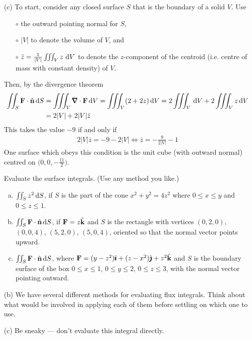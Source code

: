 \begin{solution}
\noindent (c)
To start, consider any closed surface $S$ that is the boundary of a
solid $V$. Use 
\begin{itemize}\itemsep1pt \parskip0pt  %
\item[$\circ$]
the outward pointing normal for $S$, 
\item[$\circ$]
$|V|$ to denote the volume of $V$, and
\item[$\circ$] 
$\bar z=\frac{1}{|V|}\tripInt_V z\ \dee{V}$ to denote the $z$-component 
of the centroid (i.e. centre of mass with constant density) of $V$.
\end{itemize}
Then, by the divergence theorem
\begin{align*}
\dblInt_{S} \vF\cdot\hn\,\dee{S}
&=\tripInt_V \vnabla\cdot\vF\,\dee{V}
=\tripInt_V (2+2z)\,\dee{V}
=2\tripInt_V \,\dee{V} +2\tripInt_V z\,\dee{V} \\
&=2|V| +2|V|\bar z
\end{align*}
This takes the value $-9$ if and only if
\begin{align*}
 2|V|\bar z =-9-2|V| \iff
\bar z = -\frac{9}{2|V|}-1
\end{align*}
One surface which obeys this condition is the unit cube (with outward normal)
centred on $\big(0,0, -\frac{11}{2}\big)$.


\end{solution}

\begin{question}[M317 2011D] %
Evaluate the surface integrals. (Use any method you like.)
\begin{enumerate}[(a)]
\item
$\iint_S z^2\,\mathrm{d}S$, if $S$ is the part of the cone 
$x^2 + y^2 = 4z^2$ where $0 \le x \le y$ and $0 \le z \le 1$.

\item
$\iint_S \mathbf{F} \cdot \hat{\mathbf{n}}\,\mathrm{d}S$, if $\mathbf{F} = z\hat{\mathbf{k}}$ and $S$ is the rectangle 
with vertices $(0, 2, 0)$, $(0, 0, 4)$, $(5, 2, 0)$, $(5, 0, 4)$, oriented 
so that the normal vector points upward.

\item
$\iint_S \mathbf{F} \cdot \hat{\mathbf{n}}\,\mathrm{d}S$, where $\mathbf{F} = (y - z^2 )\hat{\pmb{\imath}} + (z - x^2)\hat{\pmb{\jmath}} 
+ z^2\hat{\mathbf{k}}$ and $S$ is the boundary surface
of the box $0 \le x \le 1$, $0 \le y \le 2$, $0 \le z \le 3$, 
with the normal vector pointing outward.
\end{enumerate}
\end{question}

\begin{hint} 
(b) We have several different methods for evaluating flux integrals.
Think about what would be involved in applying each of them before 
settling on which one to use.

(c) Be sneaky --- don't evaluate this integral directly.
\end{hint}

